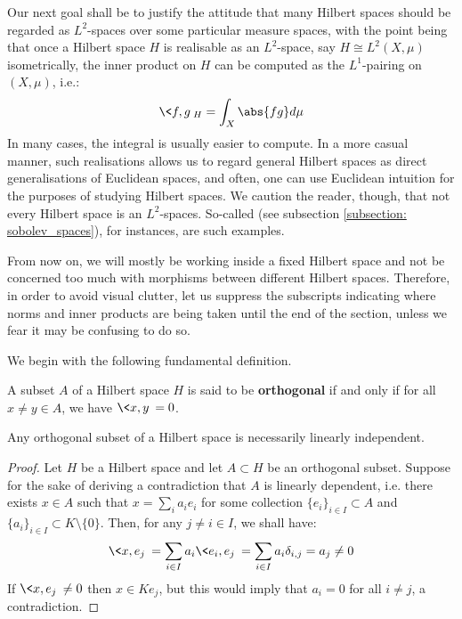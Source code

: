        Our next goal shall be to justify the attitude that many  Hilbert spaces should be regarded as $L^2$-spaces over some particular measure spaces, with the point being that once a Hilbert space $H$ is realisable as an $L^2$-space, say $H \cong L^2(X, \mu)$ isometrically, the inner product on $H$ can be computed as the $L^1$-pairing on $(X, \mu)$, i.e.:
            $$\<f, g\>_H = \int_X \abs{fg} d\mu$$
        In many cases, the integral is usually easier to compute. In a more casual manner, such realisations allows us to regard general Hilbert spaces as direct generalisations of Euclidean spaces, and often, one can use Euclidean intuition for the purposes of studying Hilbert spaces. We caution the reader, though, that not every Hilbert space is an $L^2$-spaces. So-called  (see subsection \ref{subsection: sobolev_spaces}), for instances, are such examples. 
        \begin{convention}
            From now on, we will mostly be working inside a fixed Hilbert space and not be concerned too much with morphisms between different Hilbert spaces. Therefore, in order to avoid visual clutter, let us suppress the subscripts indicating where norms and inner products are being taken until the end of the section, unless we fear it may be confusing to do so.
        \end{convention}
        We begin with the following fundamental definition.
        \begin{definition} \label{def: orthogonal_subsets}
            A subset $A$ of a Hilbert space $H$ is said to be \textbf{orthogonal} if and only if for all $x \not = y \in A$, we have $\<x, y\> = 0$.
        \end{definition}
        \begin{lemma} \label{lemma: orthogonal_subsets_linear_independence}
            Any orthogonal subset of a Hilbert space is necessarily linearly independent. 
        \end{lemma}
            \begin{proof}
                Let $H$ be a Hilbert space and let $A \subset H$ be an orthogonal subset. Suppose for the sake of deriving a contradiction that $A$ is linearly dependent, i.e. there exists $x \in A$ such that $x = \sum_i a_i e_i$ for some collection $\{e_i\}_{i \in I} \subset A$ and $\{a_i\}_{i \in I} \subset K \setminus \{0\}$. Then, for any $j \not = i \in I$, we shall have:
                    $$\<x, e_j\> = \sum_{i \in I} a_i \<e_i, e_j\> = \sum_{i \in I} a_i \delta_{i, j} = a_j \not = 0$$
                If $\<x, e_j\> \not = 0$ then $x \in K e_j$, but this would imply that $a_i = 0$ for all $i \not = j$, a contradiction.
            \end{proof}
            
